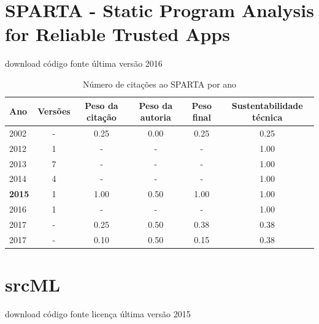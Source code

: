 \section{SPARTA - Static Program Analysis for Reliable Trusted Apps}
\checkmark download
\checkmark código fonte
\checkmark última versão 2016


\begin{table}[H]
\caption{Número de citações ao SPARTA  por ano}
\centering
\begin{tabular}{| l | c | c | c | c | c |}
  \hline
  Ano & Versões & Peso da citação & Peso da autoria & Peso final & Sustentabilidade técnica \\
  \hline
            2002
          &
          -
          &
          0.25
          &
          0.00
          &
          0.25
          &
            {\color{red} 0.25}
          \\
\hline
        2012 & 1 & - & - & -
        &
          {\color{blue} 1.00}
        \\
\hline
        2013 & 7 & - & - & -
        &
          {\color{blue} 1.00}
        \\
\hline
        2014 & 4 & - & - & -
        &
          {\color{blue} 1.00}
        \\
\hline
            {\bf 2015}
          &
          1
          &
          1.00
          &
          0.50
          &
          1.00
          &
            {\color{blue} 1.00}
          \\
\hline
        2016 & 1 & - & - & -
        &
          {\color{blue} 1.00}
        \\
\hline
            2017
          &
          -
          &
          0.25
          &
          0.50
          &
          0.38
          &
            {\color{red} 0.38}
          \\
            2017
          &
          -
          &
          0.10
          &
          0.50
          &
          0.15
          &
            {\color{red} 0.38}
          \\
\hline
\end{tabular}
\end{table}



\section{srcML}
\checkmark download
\checkmark código fonte
\checkmark licença
\checkmark última versão 2015


